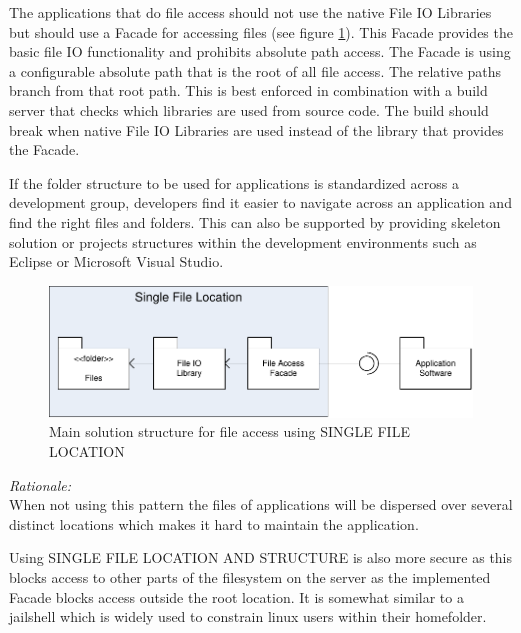 The applications that do file access should not use the native File IO Libraries but should use a {\sc Facade} \cite{Gamma95} for accessing files (see figure \ref{fig:singleFileLocationDiagram-02}). This {\sc Facade} provides the basic file IO functionality and prohibits absolute path access. The {\sc Facade} is using a configurable absolute path that is the root of all file access. The relative paths branch from that root path.  This is best enforced in combination with a build server that checks which libraries are used from source code. The build should break when native File IO Libraries are used instead of the library that provides the {\sc Facade}. 

If the folder structure to be used for applications is standardized across a development group, developers find it easier to navigate across an application and find the right files and folders. This can also be supported by providing skeleton solution or projects structures within the development environments such as Eclipse or Microsoft Visual Studio.

\begin{figure}[h!]
\centering
\includegraphics{patterns/singleFileLocationDiagram-02.pdf}
\caption{Main solution structure for file access using SINGLE FILE LOCATION}
\label{fig:singleFileLocationDiagram-02}
\end{figure} 

\begin{center}
   
\end{center}

\textit{Rationale:}\\
When not using this pattern the files of applications will be dispersed over several distinct locations which makes it hard to maintain the application.

Using SINGLE FILE LOCATION AND STRUCTURE is also more secure as this blocks access to other parts of the filesystem on the server as the implemented {\sc Facade} blocks access outside the root location. It is somewhat similar to a jailshell which is widely used to constrain linux users within their homefolder.


